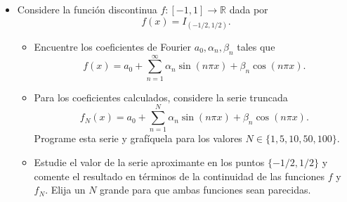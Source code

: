 \documentclass[9pt]{article}
\newcommand{\R}{\mathbb{R}}
\newcommand{\pts}[1]{[{\bf #1 puntos}] }
\begin{document}
\begin{itemize}
\begin{enumerate}
        \end{enumerate}
    \item Considere la función discontinua $f:[-1,1]\to \R$ dada por
            $$ f(x) = I_{(-1/2,1/2)}. $$
            \begin{itemize}
                \item\pts{2} Encuentre los coeficientes de Fourier $a_0, \alpha_n, \beta_n$ tales que 
                    $$ f(x) = a_0 + \sum_{n=1}^\infty \alpha_n \sin(n\pi x) + \beta_n \cos(n\pi x). $$
                \item\pts{3} Para los coeficientes calculados, considere la serie truncada
                    $$ f_N(x) = a_0 + \sum_{n=1}^N \alpha_n \sin(n\pi x) + \beta_n \cos(n\pi x). $$
                    Programe esta serie y grafíquela para los valores $N\in \{1,5,10,50,100\}$.
                \item\pts{2} Estudie el valor de la serie aproximante en los puntos $\{-1/2,1/2\}$ y comente el resultado en términos de la continuidad de las funciones $f$ y $f_N$. Elija un $N$ grande para que ambas funciones sean parecidas. 
            \end{itemize}
\end{itemize} %

\vspace{1cm}
\end{document}

